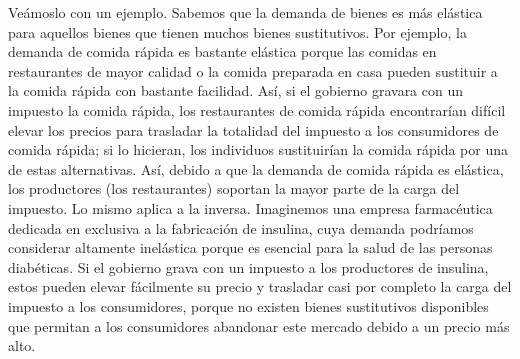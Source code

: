\documentclass[10pt,a4paper]{article}
\begin{document}
Veámoslo con un ejemplo. Sabemos que la demanda de bienes es más elástica para aquellos bienes que tienen muchos bienes sustitutivos. Por ejemplo, la demanda de comida rápida es bastante elástica porque las comidas en restaurantes de mayor calidad o la comida preparada en casa pueden sustituir a la comida rápida con bastante facilidad. Así, si el gobierno gravara con un impuesto la comida rápida, los restaurantes de comida rápida encontrarían difícil elevar los precios para trasladar la totalidad del impuesto a los consumidores de comida rápida; si lo hicieran, los individuos sustituirían la comida rápida por una de estas alternativas. Así, debido a que la demanda de comida rápida es elástica, los productores (los restaurantes) soportan la mayor parte de la carga del impuesto. Lo mismo aplica a la inversa. Imaginemos una empresa farmacéutica dedicada en exclusiva a la fabricación de insulina, cuya demanda podríamos considerar altamente inelástica porque es esencial para la salud de las personas diabéticas. Si el gobierno grava con un impuesto a los productores de insulina, estos pueden elevar fácilmente su precio y trasladar casi por completo la carga del impuesto a los consumidores, porque no existen bienes sustitutivos disponibles que permitan a los consumidores abandonar este mercado debido a un precio más alto.
\end{document}
